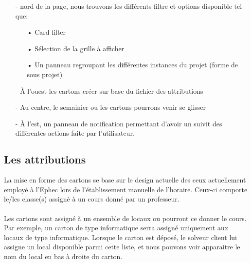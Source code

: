 \begin{itemize}	
	
	\item[-] nord de la page, nous trouvons les différents filtre et options disponible tel que:\\
	\begin{itemize}
		\item[•] Card filter\\
		\item[•] Sélection de la grille à afficher\\
		\item[•] Un panneau regroupant les différentes instances du projet (forme de sous projet)\\
	\end{itemize}
	\item[-] À l'ouest les cartons créer sur base du fichier des attributions\\
	\item[-] Au centre, le semainier ou les cartons pourrons venir se glisser\\
	\item[-] À l'est, un panneau de notification permettant d'avoir un suivit des différentes actions faite par l'utilisateur.
\end{itemize}
\subsection{Les attributions}
La mise en forme des cartons se base sur le design actuelle des ceux actuellement employé à l'Ephec lors de l'établissement manuelle de l'horaire. Ceux-ci comporte le/les classe(s) assigné à un cours donné par un professeur.\\
\\
Les cartons sont assigné à un ensemble de locaux ou pourront ce donner le cours. Par exemple, un carton de type informatique serra assigné uniquement aux locaux de type informatique. Lorsque le carton est déposé, le solveur client lui assigne un local disponible parmi cette liste, et nous pouvons voir apparaitre le nom du local en bas à droite du carton.
